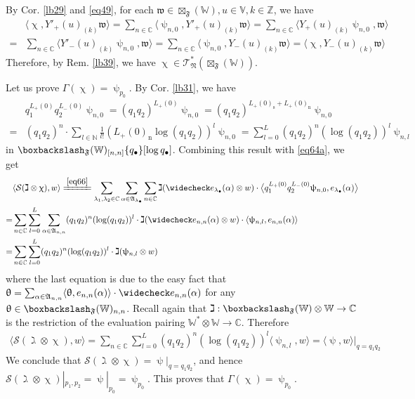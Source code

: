 \documentclass[11pt,b5paper,notitlepage]{article}
\theoremstyle{definition}
\theoremstyle{plain}
\newcommand{\fk}{\mathfrak}
\newcommand{\wch}{\widecheck}
\newcommand{\blt}{\bullet}
\newcommand{\Vbb}{\mathbb V}
\newcommand{\Wbb}{\mathbb W}
\newcommand{\Cbb}{\mathbb C}
\newcommand{\Nbb}{\mathbb N}
\newcommand{\Zbb}{\mathbb Z}
\newcommand{\<}{\left\langle}
\renewcommand{\>}{\right\rangle}
\newcommand{\ST}{\mathscr{T}}
\newcommand{\MS}{\mathcal{S}}
\newcommand{\bk}[1]{\langle {#1}\rangle}
\newcommand{\bigbk}[1]{\big\langle {#1}\big\rangle}
\newcommand{\bbs}{\boxbackslash}
\newcommand{\fn}{\mathfrak{N}}
\newcommand{\ff}{\mathfrak{F}}
\newcommand{\ssp}{\mathrm{s}}
\newcommand{\nil}{\mathrm{n}}
\numberwithin{equation}{section}
\begin{document}
By Cor. \ref{lb29} and \eqref{eq49}, for each $\fk w\in\boxtimes_\ff(\Wbb),u\in\Vbb,k\in\Zbb$, we have
\begin{align*}
&\bk{\upchi,Y'_+(u)_{(k)}\fk w}=\sum_{n\in\Cbb}\bk{\uppsi_{n,0},Y'_+(u)_{(k)}\fk w}=\sum_{n\in\Cbb}\bk{Y_+(u)_{(k)}\uppsi_{n,0},\fk w}\\
=&\sum_{n\in\Cbb}\bk{Y'_-(u)_{(k)}\uppsi_{n,0},\fk w}=\sum_{n\in\Cbb}\bk{\uppsi_{n,0},Y_-(u)_{(k)}\fk w}=\bk{\upchi,Y_-(u)_{(k)}\fk w}
\end{align*}
Therefore, by Rem. \ref{lb39}, we have  $\upchi\in\ST^*_\fn(\boxtimes_\ff(\Wbb))$. 

Let us prove $\Gamma(\upchi)=\uppsi_{p_0}$. By Cor. \ref{lb31}, we have
\begin{align*}
&q_1^{L_+(0)}q_2^{L_-(0)}\uppsi_{n,0}=(q_1q_2)^{L_+(0)}\uppsi_{n,0}=(q_1q_2)^{L_+(0)_\ssp+L_+(0)_\nil}\uppsi_{n,0}\\
=&(q_1q_2)^n\cdot \sum_{l\in\Nbb} \frac1{l!}(L_+(0)_\nil\log(q_1q_2))^l\uppsi_{n,0}=\sum_{l=0}^L(q_1q_2)^n(\log(q_1q_2))^l\uppsi_{n,l}
\end{align*}
in $\bbs_\ff(\Wbb)_{[n,n]}\{q_\blt\}[\log q_\blt]$. Combining this result with \eqref{eq64a}, we get
\begin{align*}
&\bk{\MS(\gimel\otimes\upchi),w}\xlongequal{\eqref{eq66}}\sum_{\lambda_1,\lambda_2\in\Cbb}\sum_{\alpha\in\fk A_{\lambda_\blt}}\sum_{n\in\Cbb}\gimel(\wch e_{\lambda_\blt}(\alpha)\otimes w)\cdot\bigbk{q_1^{L_+(0)}q_2^{L_-(0)}\uppsi_{n,0},e_{\lambda_\blt}(\alpha)}\\
=&\sum_{n\in\Cbb}\sum_{l=0}^L \sum_{\alpha\in\fk A_{n,n}} (q_1q_2)^n (\log(q_1q_2))^l  \cdot \gimel(\wch e_{n,n}(\alpha)\otimes w)\cdot\bk{\uppsi_{n,l},e_{n,n}(\alpha)}\\
=&\sum_{n\in\Cbb}\sum_{l=0}^L (q_1q_2)^n (\log(q_1q_2))^l  \cdot\gimel(\uppsi_{n,l}\otimes w)
\end{align*}
where the last equation is due to the easy fact that  $\uptheta=\sum_{\alpha\in\fk A_{n,n}}\bk{\uptheta,e_{n,n}(\alpha)}\cdot \wch e_{n,n}(\alpha)$ for any $\uptheta\in\bbs_\ff(\Wbb)_{n,n}$. Recall again that $\gimel:\bbs_\ff(\Wbb)\otimes\Wbb\rightarrow\Cbb$ is the restriction of the evaluation pairing $\Wbb^*\otimes\Wbb\rightarrow\Cbb$. Therefore
\begin{align*}
\bk{\MS(\gimel\otimes\upchi),w}=\sum_{n\in\Cbb}\sum_{l=0}^L  (q_1q_2)^n (\log(q_1q_2))^l  \bk{\uppsi_{n,l},w}=\bk{\uppsi,w}\big|_{q=q_1q_2}
\end{align*}
We conclude that $\MS(\gimel\otimes\upchi)=\uppsi|_{q=q_1q_2}$, and hence $\MS(\gimel\otimes\upchi)|_{p_1,p_2}=\uppsi|_{p_0}=\uppsi_{p_0}$. This proves that $\Gamma(\upchi)=\uppsi_{p_0}$.
\end{document}
